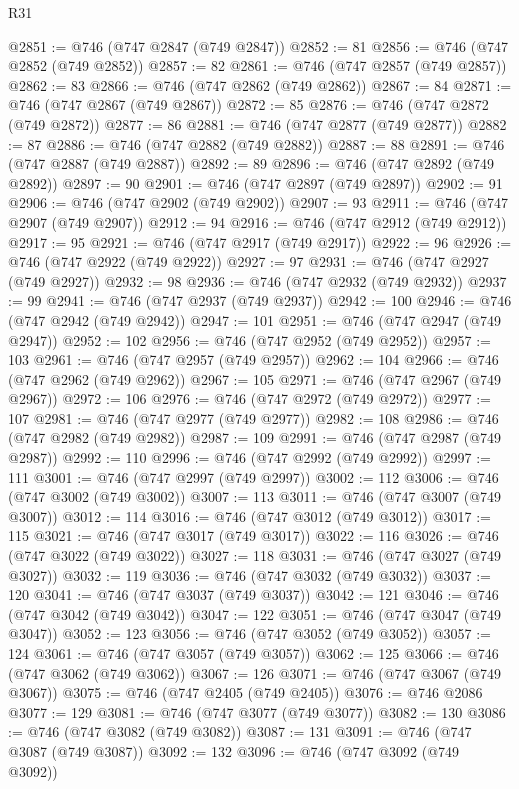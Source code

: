 \begin{lexlean}{R31}
\begin{coremodule}
@2851 := @746 (@747 @2847 (@749 @2847))
@2852 := 81
@2856 := @746 (@747 @2852 (@749 @2852))
@2857 := 82
@2861 := @746 (@747 @2857 (@749 @2857))
@2862 := 83
@2866 := @746 (@747 @2862 (@749 @2862))
@2867 := 84
@2871 := @746 (@747 @2867 (@749 @2867))
@2872 := 85
@2876 := @746 (@747 @2872 (@749 @2872))
@2877 := 86
@2881 := @746 (@747 @2877 (@749 @2877))
@2882 := 87
@2886 := @746 (@747 @2882 (@749 @2882))
@2887 := 88
@2891 := @746 (@747 @2887 (@749 @2887))
@2892 := 89
@2896 := @746 (@747 @2892 (@749 @2892))
@2897 := 90
@2901 := @746 (@747 @2897 (@749 @2897))
@2902 := 91
@2906 := @746 (@747 @2902 (@749 @2902))
@2907 := 93
@2911 := @746 (@747 @2907 (@749 @2907))
@2912 := 94
@2916 := @746 (@747 @2912 (@749 @2912))
@2917 := 95
@2921 := @746 (@747 @2917 (@749 @2917))
@2922 := 96
@2926 := @746 (@747 @2922 (@749 @2922))
@2927 := 97
@2931 := @746 (@747 @2927 (@749 @2927))
@2932 := 98
@2936 := @746 (@747 @2932 (@749 @2932))
@2937 := 99
@2941 := @746 (@747 @2937 (@749 @2937))
@2942 := 100
@2946 := @746 (@747 @2942 (@749 @2942))
@2947 := 101
@2951 := @746 (@747 @2947 (@749 @2947))
@2952 := 102
@2956 := @746 (@747 @2952 (@749 @2952))
@2957 := 103
@2961 := @746 (@747 @2957 (@749 @2957))
@2962 := 104
@2966 := @746 (@747 @2962 (@749 @2962))
@2967 := 105
@2971 := @746 (@747 @2967 (@749 @2967))
@2972 := 106
@2976 := @746 (@747 @2972 (@749 @2972))
@2977 := 107
@2981 := @746 (@747 @2977 (@749 @2977))
@2982 := 108
@2986 := @746 (@747 @2982 (@749 @2982))
@2987 := 109
@2991 := @746 (@747 @2987 (@749 @2987))
@2992 := 110
@2996 := @746 (@747 @2992 (@749 @2992))
@2997 := 111
@3001 := @746 (@747 @2997 (@749 @2997))
@3002 := 112
@3006 := @746 (@747 @3002 (@749 @3002))
@3007 := 113
@3011 := @746 (@747 @3007 (@749 @3007))
@3012 := 114
@3016 := @746 (@747 @3012 (@749 @3012))
@3017 := 115
@3021 := @746 (@747 @3017 (@749 @3017))
@3022 := 116
@3026 := @746 (@747 @3022 (@749 @3022))
@3027 := 118
@3031 := @746 (@747 @3027 (@749 @3027))
@3032 := 119
@3036 := @746 (@747 @3032 (@749 @3032))
@3037 := 120
@3041 := @746 (@747 @3037 (@749 @3037))
@3042 := 121
@3046 := @746 (@747 @3042 (@749 @3042))
@3047 := 122
@3051 := @746 (@747 @3047 (@749 @3047))
@3052 := 123
@3056 := @746 (@747 @3052 (@749 @3052))
@3057 := 124
@3061 := @746 (@747 @3057 (@749 @3057))
@3062 := 125
@3066 := @746 (@747 @3062 (@749 @3062))
@3067 := 126
@3071 := @746 (@747 @3067 (@749 @3067))
@3075 := @746 (@747 @2405 (@749 @2405))
@3076 := @746 @2086
@3077 := 129
@3081 := @746 (@747 @3077 (@749 @3077))
@3082 := 130
@3086 := @746 (@747 @3082 (@749 @3082))
@3087 := 131
@3091 := @746 (@747 @3087 (@749 @3087))
@3092 := 132
@3096 := @746 (@747 @3092 (@749 @3092))

\end{coremodule}
\end{lexlean}
